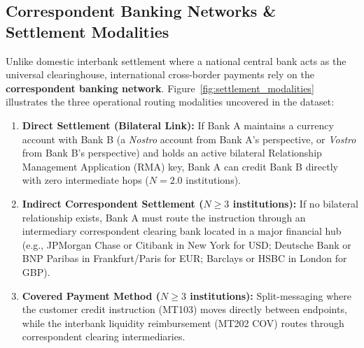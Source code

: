 \documentclass[11pt,a4paper]{article}
\begin{document}
\subsection{Correspondent Banking Networks \& Settlement Modalities}
Unlike domestic interbank settlement where a national central bank acts as the universal clearinghouse, international cross-border payments rely on the \textbf{correspondent banking network}. Figure~\ref{fig:settlement_modalities} illustrates the three operational routing modalities uncovered in the dataset:
\begin{enumerate}
    \item \textbf{Direct Settlement (Bilateral Link):} If Bank A maintains a currency account with Bank B (a \textit{Nostro} account from Bank A's perspective, or \textit{Vostro} from Bank B's perspective) and holds an active bilateral Relationship Management Application (RMA) key, Bank A can credit Bank B directly with zero intermediate hops ($N = 2.0$ institutions).
    \item \textbf{Indirect Correspondent Settlement ($N \ge 3$ institutions):} If no bilateral relationship exists, Bank A must route the instruction through an intermediary correspondent clearing bank located in a major financial hub (e.g., JPMorgan Chase or Citibank in New York for USD; Deutsche Bank or BNP Paribas in Frankfurt/Paris for EUR; Barclays or HSBC in London for GBP).
    \item \textbf{Covered Payment Method ($N \ge 3$ institutions):} Split-messaging where the customer credit instruction (MT103) moves directly between endpoints, while the interbank liquidity reimbursement (MT202 COV) routes through correspondent clearing intermediaries.
\end{enumerate}
\end{document}
